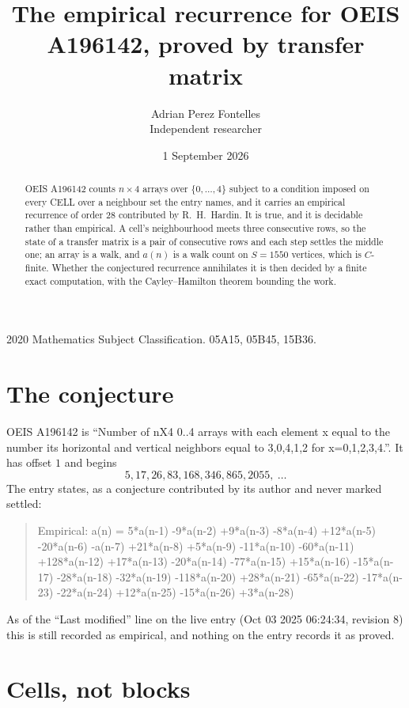 \documentclass[11pt,a4paper]{article}
\title{The empirical recurrence for OEIS A196142, proved by transfer matrix}
\author{Adrian Perez Fontelles\\ \small Independent researcher}
\date{1 September 2026}
\theoremstyle{plain}
\theoremstyle{definition}
\begin{document}
\maketitle

\begin{abstract}
OEIS A196142 counts $n\times4$ arrays over $\{0,\dots,4\}$ subject to a condition imposed on
every CELL over a neighbour set the entry names, and it carries an empirical recurrence of
order $28$ contributed by R.~H.~Hardin. It is true, and it is decidable rather than
empirical. A cell's neighbourhood meets three consecutive rows, so the state of a transfer
matrix is a pair of consecutive rows and each step settles the middle one; an array is a
walk, and $a(n)$ is a walk count on $S=1550$ vertices, which is $C$-finite. Whether the
conjectured recurrence annihilates it is then decided by a finite exact computation, with the
Cayley--Hamilton theorem bounding the work.
\end{abstract}

\noindent\small 2020 Mathematics Subject Classification. 05A15, 05B45, 15B36.\normalsize

\section{The conjecture}

OEIS A196142 is ``Number of nX4 0..4 arrays with each element x equal to the number its horizontal and vertical neighbors equal to 3,0,4,1,2 for x=0,1,2,3,4.''. It has offset $1$ and begins
\[
5, 17, 26, 83, 168, 346, 865, 2055,\ \dots
\]
The entry states, as a conjecture contributed by its author and never marked settled:
\begin{quote}
Empirical: a(n) = 5*a(n-1) -9*a(n-2) +9*a(n-3) -8*a(n-4) +12*a(n-5) -20*a(n-6) -a(n-7) +21*a(n-8) +5*a(n-9) -11*a(n-10) -60*a(n-11) +128*a(n-12) +17*a(n-13) -20*a(n-14) -77*a(n-15) +15*a(n-16) -15*a(n-17) -28*a(n-18) -32*a(n-19) -118*a(n-20) +28*a(n-21) -65*a(n-22) -17*a(n-23) -22*a(n-24) +12*a(n-25) -15*a(n-26) +3*a(n-28)
\end{quote}
As of the ``Last modified'' line on the live entry (Oct 03 2025 06:24:34, revision 8) this is still
recorded as empirical, and nothing on the entry records it as proved.

\section{Cells, not blocks}
\end{document}
